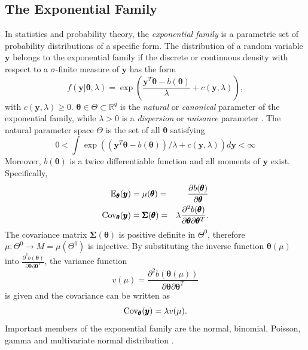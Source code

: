 \subsection{The Exponential Family}
In statistics and probability theory, the \textit{exponential family} is a parametric set of probability distributions of a specific form. The distribution of a random variable $\pmb{y}$ belongs to the exponential family if the discrete or continuous density with respect to a $\sigma$-finite measure of $\pmb{y}$ has the form
\begin{equation}
    f(\pmb{y}|\pmb{\theta}, \lambda)=\exp\left(\frac{\pmb{y}^T\pmb{\theta} - b(\pmb{\theta})}{\lambda}+c(\pmb{y},\lambda) \right),
\end{equation}
with $c(\pmb{y},\lambda)\geq 0$. 
$\pmb{\theta}\in\Theta\subset\mathbb{R}^q$ is the \textit{natural} or \textit{canonical} parameter of the exponential family, while $\lambda > 0$ is a \textit{dispersion} or \textit{nuisance} parameter \autocite[][]{holland1981exponential}. The natural parameter space $\Theta$ is the set of all $\pmb{\theta}$ satisfying
\begin{equation}
    0<\int\exp\left(\left(\pmb{y}^T\pmb{\theta} - b(\pmb{\theta})\right)/\lambda+c(\pmb{y},\lambda) \right)d\pmb{y}< \infty
\end{equation} Moreover, $b(\pmb{\theta})$ is a twice differentiable  function and all moments of $\pmb{y}$ exist. Specifically, 
\begin{alignat}{3}
    \mathbb{E}_{\pmb{\theta}}(\pmb{y}) &= \mu(\pmb{\theta}) =& \frac{\partial b(\pmb{\theta})}{\partial\pmb{\theta}} \\
    \hbox{Cov}_{\pmb{\theta}}(\pmb{y}) &= \pmb{\Sigma}(\pmb{\theta}) =& \lambda\frac{\partial^2b(\pmb{\theta})}{\partial\pmb{\theta}\partial\pmb{\theta}^T}.
\end{alignat}
The covariance matrix $\pmb{\Sigma}(\pmb{\theta})$ is positive definite in $\Theta^0$, therefore $\mu:\Theta^0\rightarrow  M = \mu\left(\Theta^0\right)$ is injective. By substituting the inverse function $\pmb{\theta}(\mu)$ into $\frac{\partial^2b(\pmb{\theta})}{\partial\pmb{\theta}\partial\pmb{\theta}^T}$, the variance function 
\begin{equation}
    v(\mu)=\frac{\partial^2b(\pmb{\theta}(\mu))}{\partial\pmb{\theta}\partial\pmb{\theta}^T}
\end{equation}
is given and the covariance can be written as
\begin{equation}
    \hbox{Cov}_{\pmb{\theta}}(\pmb{y}) = \lambda v(\mu).
\end{equation}
Important members of the exponential family are the normal, binomial, Poisson, gamma and multivariate normal distribution \autocite[][433]{fahrmeir2013multivariate}.
